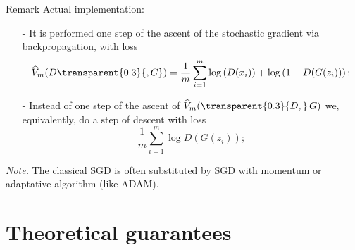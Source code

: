 \documentclass{beamer}
\begin{document}
	\begin{frame}
		\begin{block}{Remark}
			Actual implementation:
			\begin{itemize}
				\item[-] 
					{} It is performed one step of the ascent of the stochastic gradient via backpropagation, with loss 
					\vspace{-0.3cm}
					\begin{equation*}
						\widehat{V}_m(D {\transparent{0.3}{, G}}) = \frac{1}{m} \sum_{i = 1}^{m} \log{D(x_i)} + \log{1 - D(G(z_i))};
					\end{equation*}
					\vspace{-0.6cm}
				\item[-] 
				{} Instead of one step of the ascent of $\widehat{V}_m({\transparent{0.3}{D,}} \, G)$ we, equivalently, do a step of descent with loss 
					\vspace{-0.3cm}
					\begin{equation*}
						\frac{1}{m} \sum_{i = 1}^{m} \log{D(G(z_i))};
					\end{equation*}
			\end{itemize}
			\textit{Note.} The classical SGD is often substituted by SGD with momentum or adaptative algorithm (like ADAM).
		\end{block}
	\end{frame}

	\section{Theoretical guarantees}
\end{document}

